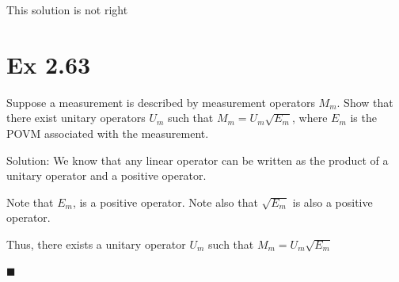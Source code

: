 \documentclass{article}
\newcommand{\0}{{$|0\rangle$}}
\newcommand{\1}{{$|1\rangle$}}
\newcommand{\2}{\frac{1}{\sqrt{2}}}
\begin{document}
This solution is not right
\newpage

\section*{Ex 2.63}
Suppose a measurement is described by measurement operators $M_m$. Show that there exist unitary operators $U_m$ such that $M_m = U_m \sqrt{E_m}$, where $E_m$ is the POVM associated with the measurement.

Solution:
We know that any linear operator can be written as the product of a unitary operator and a positive operator. 

Note that $E_m$, is a positive operator. Note also that $\sqrt{E_m}$ is also a positive operator.

Thus, there exists a unitary operator $U_m$ such that $M_m = U_m \sqrt{E_m}$

$\blacksquare$
\end{document}

